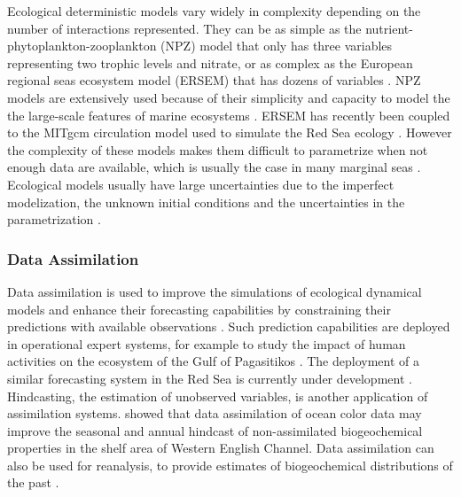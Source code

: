 Ecological deterministic models vary widely in complexity depending on
the number of interactions represented.  They can be as
simple as the nutrient-phytoplankton-zooplankton (NPZ) model
\citep{Anderson2005} that only has three variables representing two trophic
levels and nitrate, or as complex as the European regional seas ecosystem model
(ERSEM) that has dozens of variables \citep{Baretta1995}. NPZ models are
extensively used because of their simplicity and capacity to model the the
large-scale features of marine ecosystems \citep{Anderson2005}.
ERSEM has recently been coupled to the MITgcm circulation
model used to simulate the Red Sea ecology \citep{Triantafyllou2014}. However
the complexity of these models makes them difficult to parametrize when not
enough data are available, which is usually the case in many marginal seas
\citep{Anderson2005}. Ecological models usually have large uncertainties due to
the imperfect modelization, the unknown initial conditions and the
uncertainties in the parametrization \citep{Edwards2015}.

\subsubsection{Data Assimilation}

Data assimilation is used to improve the simulations of ecological dynamical
models and enhance their forecasting capabilities by constraining their
predictions with available observations \cite{Edwards2015}. Such prediction
capabilities are deployed in operational expert systems, for example to study
the impact of human activities on the ecosystem of the Gulf of Pagasitikos
\citep{Korres2012}. The deployment of a similar forecasting system in the Red
Sea is currently under development \citep{Triantafyllou2014}. Hindcasting, the
estimation of unobserved variables, is another application of assimilation
systems. \citet{Ciavatta2011} showed that data assimilation of ocean color data
may improve the seasonal and annual hindcast of non-assimilated biogeochemical
properties in the shelf area of Western English Channel. Data assimilation can
also be used for reanalysis, to provide estimates of biogeochemical
distributions of the past \citep{Fontana2013}.

